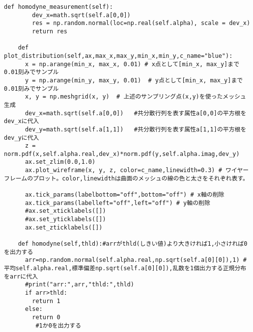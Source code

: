 \begin{lstlisting}[caption=量子状態のクラス,label=Qstate]
    def homodyne_measurement(self):
        dev_x=math.sqrt(self.a[0,0])
        res = np.random.normal(loc=np.real(self.alpha), scale = dev_x)
        return res

    def plot_distribution(self,ax,max_x,max_y,min_x,min_y,c_name="blue"):  
      x = np.arange(min_x, max_x, 0.01) # x点として[min_x, max_y]まで0.01刻みでサンプル
      y = np.arange(min_y, max_y, 0.01)  # y点として[min_x, max_y]まで0.01刻みでサンプル
      x, y = np.meshgrid(x, y)  # 上述のサンプリング点(x,y)を使ったメッシュ生成
      dev_x=math.sqrt(self.a[0,0])   #共分散行列を表す属性a[0,0]の平方根をdev_xに代入
      dev_y=math.sqrt(self.a[1,1])   #共分散行列を表す属性a[1,1]の平方根をdev_yに代入
      z = norm.pdf(x,self.alpha.real,dev_x)*norm.pdf(y,self.alpha.imag,dev_y)
      ax.set_zlim(0.0,1.0)
      ax.plot_wireframe(x, y, z, color=c_name,linewidth=0.3) # ワイヤーフレームのプロット。color,linewidthは曲面のメッシュの線の色と太さをそれぞれ表す。

      ax.tick_params(labelbottom="off",bottom="off") # x軸の削除
      ax.tick_params(labelleft="off",left="off") # y軸の削除
      #ax.set_xticklabels([]) 
      #ax.set_yticklabels([])
      ax.set_zticklabels([])

    def homodyne(self,thld):#arrがthld(しきい値)より大きければ1,小さければ0を出力する
      arr=np.random.normal(self.alpha.real,np.sqrt(self.a[0][0]),1) #平均self.alpha.real,標準偏差np.sqrt(self.a[0][0]),乱数を1個出力する正規分布をarrに代入
      #print("arr:",arr,"thld:",thld)
      if arr>thld:
        return 1
      else:
        return 0
         #1か0を出力する
\end{lstlisting}





